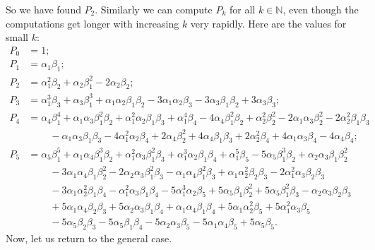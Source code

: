 \documentclass[numbers=enddot,12pt,final,onecolumn,notitlepage]{scrartcl}%
\begin{document}
So we have found $P_{2}$. Similarly we can compute $P_{k}$ for all
$k\in\mathbb{N}$, even though the computations get longer with increasing $k$
very rapidly. Here are the values for small $k$:%
\begin{align*}
P_{0}  &  =1;\\
P_{1}  &  =\alpha_{1}\beta_{1};\\
P_{2}  &  =\alpha_{1}^{2}\beta_{2}+\alpha_{2}\beta_{1}^{2}-2\alpha_{2}%
\beta_{2};\\
P_{3}  &  =\alpha_{1}^{3}\beta_{3}+\alpha_{3}\beta_{1}^{3}+\alpha_{1}%
\alpha_{2}\beta_{1}\beta_{2}-3\alpha_{1}\alpha_{2}\beta_{3}-3\alpha_{3}%
\beta_{1}\beta_{2}+3\alpha_{3}\beta_{3};\\
P_{4}  &  =\alpha_{4}\beta_{1}^{4}+\alpha_{1}\alpha_{3}\beta_{1}^{2}\beta
_{2}+\alpha_{1}^{2}\alpha_{2}\beta_{1}\beta_{3}+\alpha_{1}^{4}\beta
_{4}-4\alpha_{4}\beta_{1}^{2}\beta_{2}+\alpha_{2}^{2}\beta_{2}^{2}-2\alpha
_{1}\alpha_{3}\beta_{2}^{2}-2\alpha_{2}^{2}\beta_{1}\beta_{3}\\
&  \ \ \ \ \ \ \ \ \ \ -\alpha_{1}\alpha_{3}\beta_{1}\beta_{3}-4\alpha_{1}%
^{2}\alpha_{2}\beta_{4}+2\alpha_{4}\beta_{2}^{2}+4\alpha_{4}\beta_{1}\beta
_{3}+2\alpha_{2}^{2}\beta_{4}+4\alpha_{1}\alpha_{3}\beta_{4}-4\alpha_{4}%
\beta_{4};\\
P_{5}  &  =\alpha_{5}\beta_{1}^{5}+\alpha_{1}\alpha_{4}\beta_{1}^{3}\beta
_{2}+\alpha_{1}^{2}\alpha_{3}\beta_{1}^{2}\beta_{3}+\alpha_{1}^{3}\alpha
_{2}\beta_{1}\beta_{4}+\alpha_{1}^{5}\beta_{5}-5\alpha_{5}\beta_{1}^{3}%
\beta_{2}+\alpha_{2}\alpha_{3}\beta_{1}\beta_{2}^{2}\\
&  \ \ \ \ \ \ \ \ \ \ -3\alpha_{1}\alpha_{4}\beta_{1}\beta_{2}^{2}%
-2\alpha_{2}\alpha_{3}\beta_{1}^{2}\beta_{3}-\alpha_{1}\alpha_{4}\beta_{1}%
^{2}\beta_{3}+\alpha_{1}\alpha_{2}^{2}\beta_{2}\beta_{3}-2\alpha_{1}^{2}%
\alpha_{3}\beta_{2}\beta_{3}\\
&  \ \ \ \ \ \ \ \ \ \ -3\alpha_{1}\alpha_{2}^{2}\beta_{1}\beta_{4}-\alpha
_{1}^{2}\alpha_{3}\beta_{1}\beta_{4}-5\alpha_{1}^{3}\alpha_{2}\beta
_{5}+5\alpha_{5}\beta_{1}\beta_{2}^{2}+5\alpha_{5}\beta_{1}^{2}\beta
_{3}-\alpha_{2}\alpha_{3}\beta_{2}\beta_{3}\\
&  \ \ \ \ \ \ \ \ \ \ +5\alpha_{1}\alpha_{4}\beta_{2}\beta_{3}+5\alpha
_{2}\alpha_{3}\beta_{1}\beta_{4}+\alpha_{1}\alpha_{4}\beta_{1}\beta
_{4}+5\alpha_{1}\alpha_{2}^{2}\beta_{5}+5\alpha_{1}^{2}\alpha_{3}\beta_{5}\\
&  \ \ \ \ \ \ \ \ \ \ -5\alpha_{5}\beta_{2}\beta_{3}-5\alpha_{5}\beta
_{1}\beta_{4}-5\alpha_{2}\alpha_{3}\beta_{5}-5\alpha_{1}\alpha_{4}\beta
_{5}+5\alpha_{5}\beta_{5}.
\end{align*}
Now, let us return to the general case.
\end{document}
